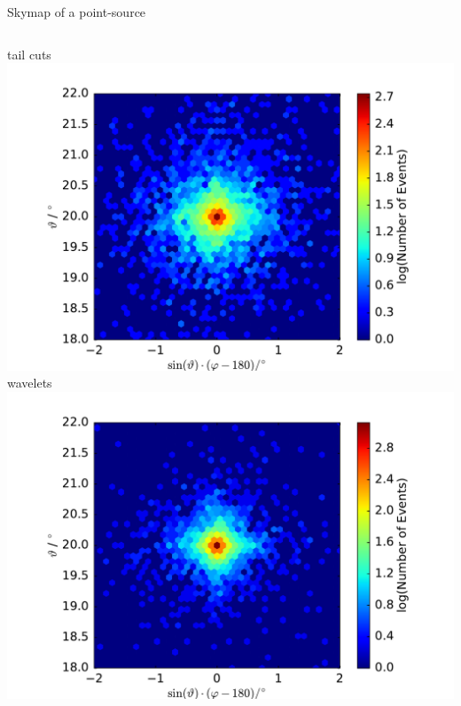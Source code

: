 \documentclass[8pt]{beamer}
\begin{document}
    
    \begin{frame}{Skymap of a point-source}
        \begin{columns}
                \centering
                tail cuts\\
                \includegraphics[trim=2.2cm 0 2.5cm 5mm,clip,width=.95\textwidth]{pics/CTA/skymap_tail.pdf}
                \centering
                wavelets\\                
                \includegraphics[trim=2.2cm 0 2.5cm 5mm,clip,width=.95\textwidth]{pics/CTA/skymap_wave.pdf}
        \end{columns}

    \end{frame}

    
\end{document}
